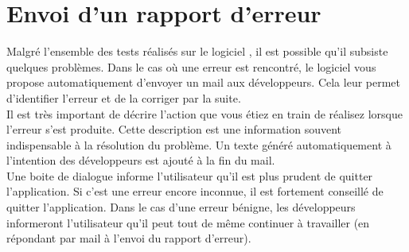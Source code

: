 \section{Envoi d'un rapport d'erreur}
Malgré l'ensemble des tests réalisés sur le logiciel \tria, il est possible qu'il subsiste quelques problèmes. Dans le cas où une erreur est rencontré, le logiciel vous propose automatiquement d'envoyer un mail aux développeurs. Cela leur permet d'identifier l'erreur et de la corriger par la suite.\\

Il est très important de décrire l'action que vous étiez en train de réalisez lorsque l'erreur s'est produite. Cette description est une information souvent indispensable à la résolution du problème. Un texte généré automatiquement à l'intention des développeurs est ajouté à la fin du mail.\\

Une boite de dialogue informe l'utilisateur qu'il est plus prudent de quitter l'application. Si c'est une erreur encore inconnue, il est fortement conseillé de quitter l'application. Dans le cas d'une erreur bénigne, les développeurs informeront l'utilisateur qu'il peut tout de même continuer à travailler (en répondant par mail à l'envoi du rapport d'erreur).\\





